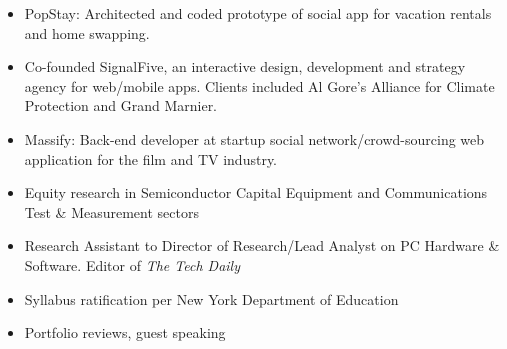 \documentclass[a4paper,10pt]{memoir} %
\begin{document}
\begin{itemize}
	\item PopStay: Architected and coded prototype of social app for vacation rentals and home swapping.
	\item Co-founded SignalFive, an interactive design, development and strategy agency for web/mobile apps. Clients included Al Gore's Alliance for Climate Protection and Grand Marnier. 
	\item Massify: Back-end developer at startup social network/crowd-sourcing web application for the film and TV industry.
\end{itemize}
\Sep %


\begin{itemize}
	\item Equity research in Semiconductor Capital Equipment and Communications Test \& Measurement sectors
\end{itemize}
\Sep %

\begin{itemize}
	\item Research Assistant to Director of Research/Lead Analyst on PC Hardware \& Software. Editor of \textit{The Tech Daily}
\end{itemize}

\Sep %



\begin{itemize}
	\item Syllabus ratification per New York Department of Education 
	\item Portfolio reviews, guest speaking
\end{itemize}
\end{document}
